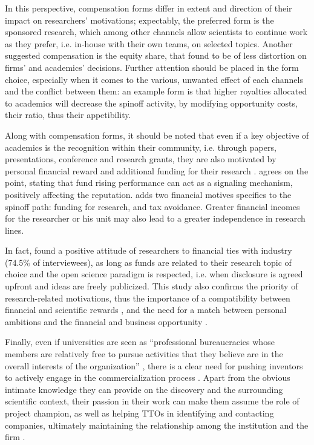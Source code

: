 In this perspective, compensation forms differ in extent and direction of their impact on researchers' motivations; expectably, the preferred form is the sponsored research, which among other channels allow scientists to continue work as they prefer, i.e. in-house with their own teams, on selected topics. Another suggested compensation is the equity share, that \citet{Jensen1998} found to be of less distortion on firms' and academics' decisions. Further attention should be placed in the form choice, especially when it comes to the various, unwanted effect of each channels and the conflict between them: an example form \citet{OShea2004} is that higher royalties allocated to academics will decrease the spinoff activity, by modifying opportunity costs, their ratio, thus their appetibility.

Along with compensation forms, it should be noted that even if a key objective of academics is the recognition within their community, i.e. through papers, presentations, conference and research grants, they are also motivated by personal financial reward and additional funding for their research \citep{Siegel2003a, Link2007, Fini2009}. \citet{DEste2007, DEste2011} agrees on the point, stating that fund rising performance can act as a signaling mechanism, positively affecting the reputation. \citet{Rizzo2015} adds two financial motives specifics to the spinoff path: funding for research, and tax avoidance. Greater financial incomes for the researcher or his unit may also lead to a greater independence in research lines.

In fact, \citet{DEste2011} found a positive attitude of researchers to financial ties with industry (74.5\% of interviewees), as long as funds are related to their research topic of choice and the open science paradigm is respected, i.e. when disclosure is agreed upfront and ideas are freely publicized. This study also confirms the priority of research-related motivations, thus the importance of a compatibility between financial and scientific rewards \citep{Link2007, Baldini2007}, and the need for a match between personal ambitions and the financial and business opportunity \citep{Tijssen2006}.

Finally, even if universities are seen as \enquote{professional bureaucracies whose members are relatively free to pursue activities that they believe are in the overall interests of the organization} \citep{DEste2011}, there is a clear need for pushing inventors to actively engage in the commercialization process \citep{Jensen1998}. Apart from the obvious intimate knowledge they can provide on the discovery and the surrounding scientific context, their passion in their work can make them assume the role of project champion, as well as helping TTOs in identifying and contacting companies, ultimately maintaining the relationship among the institution and the firm \citep{Markman2005}.

